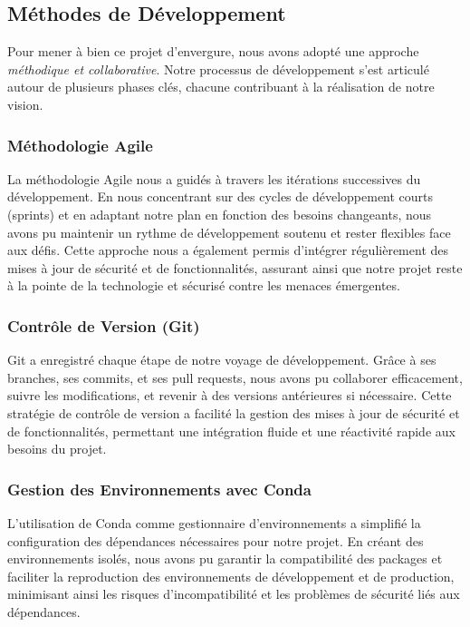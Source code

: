 \subsection{Méthodes de Développement}

Pour mener à bien ce projet d'envergure, nous avons adopté une approche \textit{méthodique et collaborative}. Notre processus de développement s'est articulé autour de plusieurs phases clés, chacune contribuant à la réalisation de notre vision.

\subsubsection{Méthodologie Agile}

La méthodologie Agile nous a guidés à travers les itérations successives du développement. En nous concentrant sur des cycles de développement courts (sprints) et en adaptant notre plan en fonction des besoins changeants, nous avons pu maintenir un rythme de développement soutenu et rester flexibles face aux défis. Cette approche nous a également permis d'intégrer régulièrement des mises à jour de sécurité et de fonctionnalités, assurant ainsi que notre projet reste à la pointe de la technologie et sécurisé contre les menaces émergentes.

\subsubsection{Contrôle de Version (Git)}

Git a enregistré chaque étape de notre voyage de développement. Grâce à ses branches, ses commits, et ses pull requests, nous avons pu collaborer efficacement, suivre les modifications, et revenir à des versions antérieures si nécessaire. Cette stratégie de contrôle de version a facilité la gestion des mises à jour de sécurité et de fonctionnalités, permettant une intégration fluide et une réactivité rapide aux besoins du projet.

\subsubsection{Gestion des Environnements avec Conda}

L'utilisation de Conda comme gestionnaire d'environnements a simplifié la configuration des dépendances nécessaires pour notre projet. En créant des environnements isolés, nous avons pu garantir la compatibilité des packages et faciliter la reproduction des environnements de développement et de production, minimisant ainsi les risques d'incompatibilité et les problèmes de sécurité liés aux dépendances.

